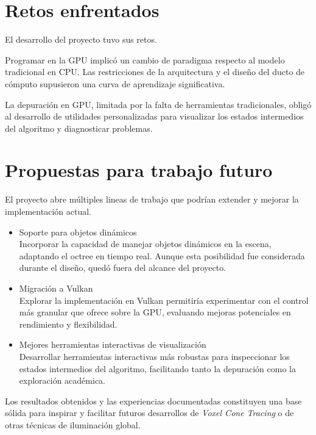 \section{Retos enfrentados}

El desarrollo del proyecto tuvo sus retos.

Programar en la GPU implicó un cambio de paradigma respecto al modelo tradicional en CPU.
Las restricciones de la arquitectura y el diseño del ducto de cómputo supusieron una curva de aprendizaje significativa.

La depuración en GPU, limitada por la falta de herramientas tradicionales, obligó al desarrollo de utilidades personalizadas para visualizar los estados intermedios del algoritmo y diagnosticar problemas.

\section{Propuestas para trabajo futuro}

El proyecto abre múltiples lineas de trabajo que podrían extender y mejorar la implementación actual.

\begin{itemize}
    \item Soporte para objetos dinámicos\\
        Incorporar la capacidad de manejar objetos dinámicos en la escena, adaptando el octree en tiempo real.
        Aunque esta posibilidad fue considerada durante el diseño, quedó fuera del alcance del proyecto.
    \item Migración a Vulkan\\
        Explorar la implementación en Vulkan permitiría experimentar con el control más granular que ofrece sobre la GPU, evaluando mejoras potenciales en rendimiento y flexibilidad.
    \item Mejores herramientas interactivas de visualización\\
        Desarrollar herramientas interactivas más robustas para inspeccionar los estados intermedios del algoritmo, facilitando tanto la depuración como la exploración académica.
\end{itemize}

Los resultados obtenidos y las experiencias documentadas constituyen una base sólida para inspirar y facilitar futuros desarrollos de \textit{Voxel Cone Tracing} o de otras técnicas de iluminación global.
